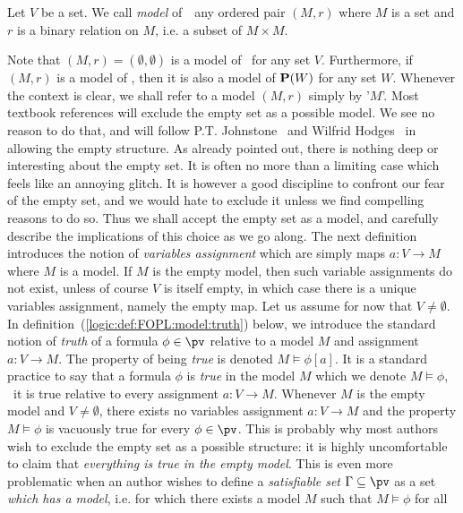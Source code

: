 \begin{defin}\label{logic:def:FOPL:model:model}
Let $V$ be a set. We call {\em model} of\, \pv\ any ordered pair
$(M,r)$ where $M$ is a set and $r$ is a binary relation on $M$, i.e.
a subset of $M\times M$.
\end{defin}
Note that $(M,r)=(\emptyset,\emptyset)$ is a model of \pv\ for any
set $V$. Furthermore, if $(M,r)$ is a model of \pv, then it is also
a model of ${\bf P}(W)$ for any set $W$. Whenever the context is
clear, we shall refer to a model $(M,r)$ simply by '$M$'. Most
textbook references will exclude the empty set as a possible model.
We see no reason to do that, and will follow P.T.
Johnstone~\cite{Johnstone}  and Wilfrid Hodges~\cite{Hodges} in
allowing the empty structure. As already pointed out, there is
nothing deep or interesting about the empty set. It is often no more
than a limiting case which feels like an annoying glitch. It is
however a good discipline to confront our fear of the empty set, and
we would hate to exclude it unless we find compelling reasons to do
so. Thus we shall accept the empty set as a model, and carefully
describe the implications of this choice as we go along. The next
definition introduces the notion of {\em variables assignment} which
are simply maps $a:V\to M$ where $M$ is a model. If $M$ is the empty
model, then such variable assignments do not exist, unless of course
$V$ is itself empty, in which case there is a unique variables
assignment, namely the empty map. Let us assume for now that
$V\neq\emptyset$. In definition~(\ref{logic:def:FOPL:model:truth})
below, we introduce the standard notion of {\em truth} of a formula
$\phi\in\pv$ relative to a model $M$ and assignment $a:V\to M$. The
property of being {\em true} is denoted $M\vDash\phi[a]$. It is a
standard practice to say that a formula $\phi$ is {\em true} in the
model $M$ which we denote $M\vDash\phi$, \ifand\ it is true relative
to every assignment $a:V\to M$. Whenever $M$ is the empty model and
$V\neq\emptyset$, there exists no variables assignment $a:V\to M$
and the property $M\vDash\phi$ is vacuously true for every
$\phi\in\pv$. This is probably why most authors wish to exclude the
empty set as a possible structure: it is highly uncomfortable to
claim that {\em everything is true in the empty model}. This is even
more problematic when an author wishes to define a {\em satisfiable
set} $\Gamma\subseteq\pv$ as a set {\em which has a model}, i.e. for
which there exists a model $M$ such that $M\vDash\phi$ for all
